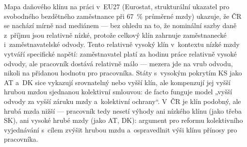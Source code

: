 Mapa daňového klínu na práci v~\ac{EU}27 (Eurostat, strukturální ukazatel pro svobodného bezdětného zaměstnance při \SI{67}{\percent} průměrné mzdy) ukazuje, že ČR se nachází mírně nad mediánem --- bez ohledu na to, že nominální sazby daně z~příjmu jsou relativně nízké, protože celkový klín zahrnuje zaměstnanecké i~zaměstnavatelské odvody.
Tento relativně vysoký klín v~kontextu nízké mzdy vytváří specifické napětí: zaměstnavatel platí za hodinu práce relativně vysoké odvody, ale pracovník dostává relativně málo --- mezera jde na vrub odvodu, nikoli na přidanou hodnotu pro pracovníka.
Státy s~vysokým pokrytím \ac{KS} jako AT a~DK sice vykazují srovnatelný nebo vyšší klín, ale kompenzují jej vyšší hrubou mzdou sjednanou kolektivní smlouvou: de facto funguje model „vyšší odvody za vyšší záruku mzdy a~kolektivní ochrany“.
V~ČR je klín podobný, ale hrubá mzda nižší --- pracovník tedy nesetí výhody ani nízkého klínu (jako třeba SK), ani vysoké hrubé mzdy (jako AT, DK): argument pro reformu kolektivního vyjednávání s~cílem zvýšit hrubou mzdu a~ospravedlnit výši klínu přínosy pro pracovníka.


